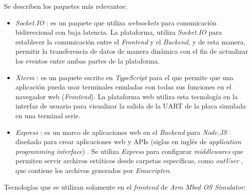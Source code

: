 Se describen los paquetes más relevantes:

\begin{itemize}
    \item \textit{Socket.IO} \citep{Socket}: es un paquete que utiliza \textit{websockets} para comunicación bidireccional con baja latencia. La plataforma, utiliza \textit{Socket.IO} para establecer la comunicación entre el \textit{Frontend} y el \textit{Backend}, y de esta manera, permitir la transferencia de datos de manera dinámica con el fin de actualizar los eventos entre ambas partes de la plataforma.

    \item \textit{Xterm} \citep{Xterm}: es un paquete escrito en \textit{TypeScript} \citep{TypeScript} para el que permite que una aplicación pueda usar terminales emuladas con todas sus funciones en el navegador web (\textit{Frontend}). La plataforma web utiliza esta tecnología en la interfaz de usuario para visualizar la salida de la UART de la placa simulada en una terminal serie.

    \item \textit{Express} \citep{Express}: es un marco de aplicaciones web en el \textit{Backend} para \textit{Node.JS} diseñado para crear aplicaciones web y APIs (siglas en inglés de \textit{application programming interface}) \citep{API}. Se utiliza \textit{Express} para configurar \textit{middlewares} que permiten servir archivos estáticos desde carpetas específicas, como \textquotedbl \textit{outUser} \textquotedbl, que contiene los archivos generados por \textit{Emscripten}.

\end{itemize}

Tecnologías que se utilizan solamente en el \textit{frontend} de \textit{Arm Mbed OS Simulator}:

